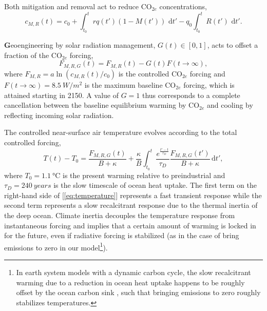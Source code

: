 \documentclass[9pt,twocolumn,twoside,lineno]{pnas-new}
\begin{document}
Both mitigation and removal act to reduce CO$_{2e}$ concentrations,
\begin{equation}
    c_{M,R}(t) = c_{0} + \int_{t_{0}}^{t} rq(t')(1-M(t')) \text{ d}t' - q_{0} \int_{t_{0}}^{t} R(t')\text{ d}t'.
\end{equation}

\textbf{G}eoengineering by solar radiation management, $G(t) \in [0,1]$, acts to offset a fraction of the CO$_{2e}$ forcing, 
\begin{equation}
    F_{M,R,G}(t) = F_{M,R}(t) - G(t) F(t \rightarrow \infty),
\end{equation}
where $F_{M,R} = a \ln(c_{M,R}(t) / c_{0})$ is the controlled CO$_{2e}$ forcing and $F(t \rightarrow \infty) = \SI{8.5}{W/m^{2}}$ is the maximum baseline CO$_{2e}$ forcing, which is attained starting in 2150. A value of $G = 1$ thus corresponds to a complete cancellation between the baseline equilibrium warming by CO$_{2e}$ and cooling by reflecting incoming solar radiation.

The controlled near-surface air temperature evolves according to the total controlled forcing,
\begin{equation}
    T(t) - T_{0} = \frac{F_{M,R,G}(t)}{B + \kappa} + \frac{\kappa}{B} \int_{t_{0}}^{t} \frac{e^{\frac{t'-t}{\tau_{D}}}}{\tau_{D}} \frac{F_{M,R,G}(t')}{B+\kappa} \, \text{d}t',
    \label{eq:temperature}
\end{equation}
where $T_{0} = \SI{1.1}{\celsius}$ is the present warming relative to preindustrial and $\tau_{D} = \SI{240}{years}$ is the slow timescale of ocean heat uptake. The first term on the right-hand side of [\ref{eq:temperature}] represents a fast transient response while the second term represents a slow recalcitrant response due to the thermal inertia of the deep ocean. Climate inertia decouples the temperature response from instantaneous forcing and implies that a certain amount of warming is locked in for the future, even if radiative forcing is stabilized (as in the case of bring emissions to zero in our model\footnote{In earth system models with a dynamic carbon cycle, the slow recalcitrant warming due to a reduction in ocean heat uptake happens to be roughly offset by the ocean carbon sink \cite{solomon_irreversible_2009,lickley_time_2019}, such that bringing emissions to zero roughly stabilizes temperatures.}).
\end{document}
